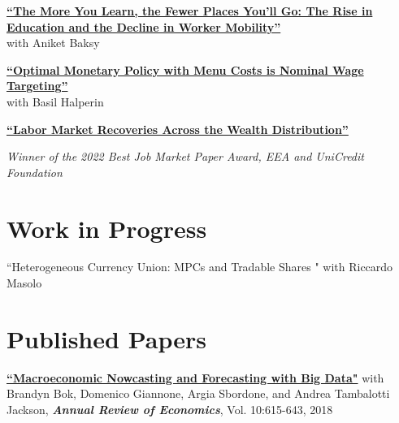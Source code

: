 \documentclass[margin,line]{res}                          %
\newenvironment{list1}{
	\begin{list}{\ding{113}}{%
			\setlength{\itemsep}{0in}
			\setlength{\parsep}{0in} \setlength{\parskip}{0in}
			\setlength{\topsep}{0in} \setlength{\partopsep}{0in}
			\setlength{\leftmargin}{0.17in}}}{\end{list}}
\begin{document}
\begin{resume}
\begin{list1}
		\item[] \href{https://danicaratelli.github.io/research/papers/The_Long_term_Decline_of_the_US_Job_Ladder.pdf}{\textbf{{\color{darkblue}``The More You Learn, the Fewer Places You’ll Go: The Rise in Education and the Decline in Worker Mobility''}}}\\ 
		with Aniket Baksy\smallskip
		
		\vspace{7pt}
				
		\item[] \href{https://danicaratelli.github.io/research/papers/OptimalMP_CaratelliHalperin.pdf}{\textbf{``Optimal Monetary Policy with Menu Costs is Nominal Wage Targeting''}}\\ with Basil Halperin\smallskip
		
		\vspace{7pt}
		
		\item[] \href{https://danicaratelli.github.io/research/papers/JMP_Caratelli.pdf}{\textbf{{\color{darkblue}``Labor Market Recoveries Across the Wealth Distribution''}}}
		\item[] \emph{\textit{Winner of the 2022 Best Job Market Paper Award, EEA and UniCredit Foundation}}\smallskip
					
	\end{list1}
	
	\section{\sc Work in Progress}
	\begin{list1}
		\item[] ``Heterogeneous Currency Union: MPCs and Tradable Shares " with Riccardo Masolo \smallskip
	\end{list1}
	
	\section{\sc Published Papers}
	\begin{list1}
		\item[] \href{https://www.annualreviews.org/doi/abs/10.1146/annurev-economics-083120-111540}{\textbf{``Macroeconomic Nowcasting and Forecasting with Big Data"}} with  Brandyn Bok, Domenico Giannone, Argia Sbordone, and Andrea Tambalotti  Jackson, \textit{\textbf{Annual Review of Economics}}, Vol. 10:615-643, 2018 \smallskip
	\end{list1}
	

\end{resume}
\end{document}
